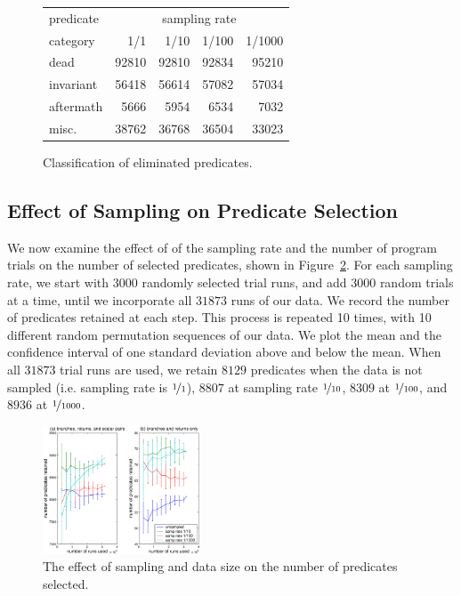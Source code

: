 \begin{figure}[h]
\begin{center}
\begin{tabular}{|l|r|r|r|r|}
\hline
predicate &  \multicolumn{4}{c|}{sampling rate} \\
\cline{2-5}
category  &  1/1 & 1/10 & 1/100 & 1/1000 \\
\hline
\hline
dead      &  92810 & 92810 & 92834 & 95210 \\
\hline
invariant &  56418 & 56614 & 57082 & 57034 \\
\hline
aftermath &  5666  & 5954  & 6534  & 7032 \\
\hline
misc.     &  38762 & 36768 & 36504 & 33023 \\
\hline
\end{tabular}
\caption{Classification of eliminated predicates.}
\label{predelim}
\end{center}
\end{figure}

\subsection{Effect of Sampling on Predicate Selection}

We now examine the effect of of the sampling rate and the number of
program trials on the number of selected predicates, shown in
 Figure~\ref{fig-predkept}.
For each sampling rate, we start with $3000$ randomly
selected trial runs, and add $3000$ random trials at a time, until we
incorporate all $31873$ runs of our data.  We record the number of
predicates retained at each step.  This process is repeated 10 times,
with 10 different random permutation sequences
of our data. We plot the mean and the confidence interval of one
standard deviation above and below the mean.  When all $31873$ trial
runs are used, we retain $8129$ predicates when the data is not
sampled (i.e. sampling rate is $\nicefrac{1}{1}$), $8807$ at sampling
rate $\nicefrac{1}{10}$, $8309$ at $\nicefrac{1}{100}$, and $8936$ at
$\nicefrac{1}{1000}$.

\begin{figure}
  \centering
  \includegraphics[height=1.5in,width=\columnwidth]{predkept1}
  \caption{The effect of sampling and data size on the number of
  predicates selected.}
  \label{fig-predkept}
\end{figure}

